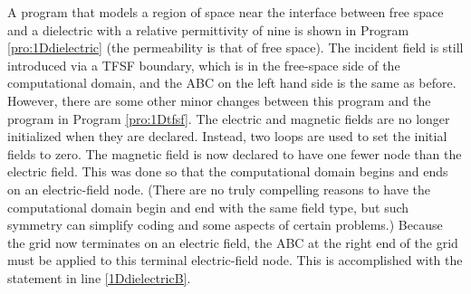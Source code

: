 A program that models a region of space near the interface between
free space and a dielectric with a relative permittivity of nine is
shown in Program \ref{pro:1Ddielectric} (the permeability is that of
free space).  The incident field is still introduced via a TFSF
boundary, which is in the free-space side of the computational domain,
and the ABC on the left hand side is the same as before.  However,
there are some other minor changes between this program and the
program in Program \ref{pro:1Dtfsf}.  The electric and magnetic fields
are no longer initialized when they are declared.  Instead, two loops
are used to set the initial fields to zero.  The magnetic field is now
declared to have one fewer node than the electric field.  This was
done so that the computational domain begins and ends on an
electric-field node.  (There are no truly compelling reasons to have
the computational domain begin and end with the same field type, but
such symmetry can simplify coding and some aspects of certain
problems.)  Because the grid now terminates on an electric field, the
ABC at the right end of the grid must be applied to this terminal
electric-field node.  This is accomplished with the statement in line
\ref{1DdielectricB}.

